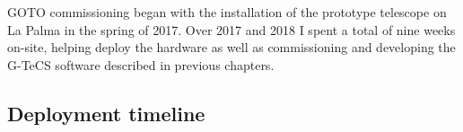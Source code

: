 
\begin{colsection}

GOTO commissioning began with the installation of the prototype telescope on La Palma in the spring of 2017. Over 2017 and 2018 I spent a total of nine weeks on-site, helping deploy the hardware as well as commissioning and developing the G-TeCS software described in previous chapters.

\end{colsection}


\subsection{Deployment timeline}
\label{sec:timeline}
